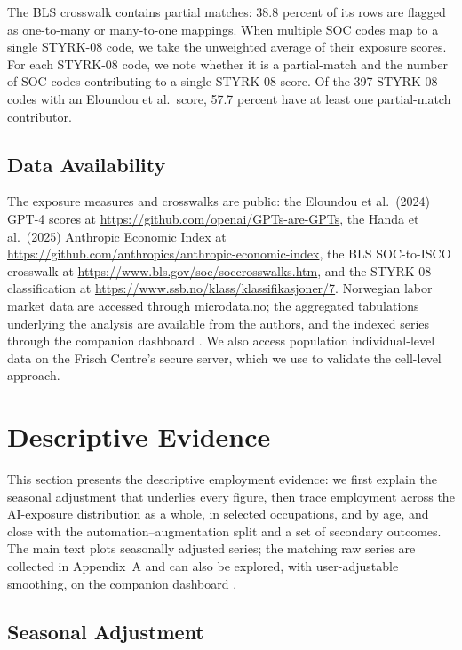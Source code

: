 \documentclass[12pt]{article}
\begin{document}
The BLS crosswalk contains partial matches: 38.8 percent of its rows are flagged as one-to-many or many-to-one mappings. When multiple SOC codes map to a single STYRK-08 code, we take the unweighted average of their exposure scores. For each STYRK-08 code, we note whether it is a partial-match and the number of SOC codes contributing to a single STYRK-08 score. Of the 397 STYRK-08 codes with an Eloundou et al.\ score, 57.7 percent have at least one partial-match contributor.


\subsection*{Data Availability}

The exposure measures and crosswalks are public: the Eloundou et al.\ (2024) GPT-4 scores at \url{https://github.com/openai/GPTs-are-GPTs}, the Handa et al.\ (2025) Anthropic Economic Index at \url{https://github.com/anthropics/anthropic-economic-index}, the BLS SOC-to-ISCO crosswalk at \url{https://www.bls.gov/soc/soccrosswalks.htm}, and the STYRK-08 classification at \url{https://www.ssb.no/klass/klassifikasjoner/7}. Norwegian labor market data are accessed through microdata.no; the aggregated tabulations underlying the analysis are available from the authors, and the indexed series through the companion dashboard \citep{kiindeksen2026}. We also access population individual-level data on the Frisch Centre's secure server, which we use to validate the cell-level approach. 




\section{Descriptive Evidence}\label{sec:results}

This section presents the descriptive employment evidence: we first explain the seasonal adjustment that underlies every figure, then trace employment across the AI-exposure distribution as a whole, in selected occupations, and by age, and close with the automation--augmentation split and a set of secondary outcomes. The main text plots seasonally adjusted series; the matching raw series are collected in Appendix~A and can also be explored, with user-adjustable smoothing, on the companion dashboard \citep{kiindeksen2026}.

\subsection{Seasonal Adjustment}\label{sec:results:sa}
\end{document}
